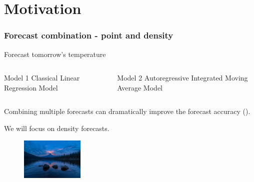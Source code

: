 \section{Motivation}

\logo{}

\begin{frame}
    \frametitle{Forecast combination - point and density}

    Forecast tomorrow's temperature
    \vspace{-5mm}
    \begin{columns}[t]
    \begin{column}{0.4\textwidth}
        \begin{exampleblock}{Model 1}
        Classical Linear Regression Model
        \end{exampleblock}
    \end{column}
    
    \begin{column}{0.5\textwidth}
        \begin{exampleblock}{Model 2}
        Autoregressive Integrated Moving Average Model
        \end{exampleblock}
    \end{column}
    \end{columns}

    \vspace{5mm}
    
    Combining multiple forecasts can dramatically improve the forecast accuracy (\cite{BG69}).
    
    \vspace{2mm}
    
    We will focus on density forecasts.

\begin{figure}[b]
\centering
\includegraphics[width=3cm]{Graph/Weather.jpg}
\end{figure}

\end{frame}

